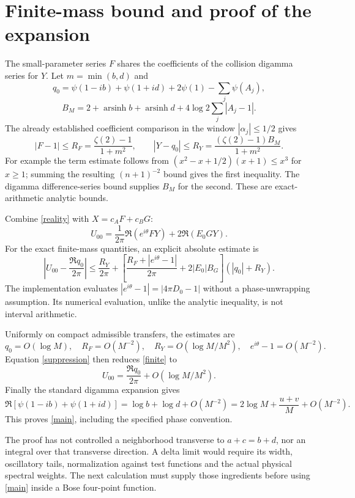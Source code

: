 \documentclass[11pt,a4paper]{article}
\begin{document}
\newpage
\section{Finite-mass bound and proof of the expansion}
The small-parameter series $F$ shares the coefficients of the collision
digamma series for $Y$. Let $m=\min(b,d)$ and
\[
 q_0=\psi(1-ib)+\psi(1+id)+2\psi(1)-\sum_j\psi(A_j),
\]
\[
 B_M=2+\operatorname{arsinh}b+\operatorname{arsinh}d
                    +4\log2\sum_j|A_j-1|.
\]
The already established coefficient comparison in the window
$|\alpha_j|\le1/2$ gives
\begin{equation}
 |F-1|\le R_F=\frac{\zeta(2)-1}{1+m^2},\qquad
 |Y-q_0|\le R_Y=\frac{(\zeta(2)-1)B_M}{1+m^2}.
 \label{small}
\end{equation}
For example the term estimate follows from
$(x^2-x+1/2)(x+1)\le x^3$ for $x\ge1$; summing the resulting
$(n+1)^{-2}$ bound gives the first inequality.
The digamma difference-series bound supplies $B_M$ for the second.
These are exact-arithmetic analytic bounds.

Combine \eqref{reality} with $X=c_AF+c_BG$:
\[
 U_{00}=\frac1{2\pi}\Re(e^{i\theta}FY)+2\Re(E_0GY).
\]
For the exact finite-mass quantities, an explicit absolute estimate is
\begin{equation}
 \left|U_{00}-\frac{\Re q_0}{2\pi}\right|
 \le \frac{R_Y}{2\pi}
 +\left[\frac{R_F+|e^{i\theta}-1|}{2\pi}
                +2|E_0|B_G\right](|q_0|+R_Y).
 \label{finite}
\end{equation}
The implementation evaluates $|e^{i\theta}-1|=|4\pi D_0-1|$ without
a phase-unwrapping assumption. Its numerical evaluation, unlike the
analytic inequality, is not interval arithmetic.

Uniformly on compact admissible transfers, the estimates are
\[
q_0=O(\log M),\quad R_F=O(M^{-2}),\quad
R_Y=O(\log M/M^2),\quad e^{i\theta}-1=O(M^{-2}).
\]
Equation \eqref{suppression} then reduces \eqref{finite} to
\[
 U_{00}=\frac{\Re q_0}{2\pi}
                  +O(\log M/M^2).
\]
Finally the standard digamma expansion gives
\[
 \Re[\psi(1-ib)+\psi(1+id)]
 =\log b+\log d+O(M^{-2})
 =2\log M+\frac{u+v}{M}+O(M^{-2}).
\]
This proves \eqref{main}, including the specified phase convention.

The proof has not controlled a neighborhood transverse to
$a+c=b+d$, nor an integral over that transverse direction.
A delta limit would require its width, oscillatory tails, normalization
against test functions and the actual physical spectral weights.
The next calculation must supply those ingredients before using
\eqref{main} inside a Bose four-point function.
\end{document}
